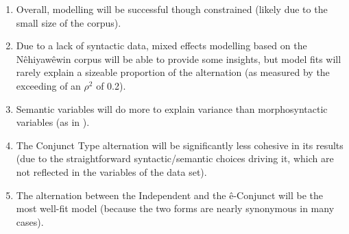 \begin{enumerate}
    \item Overall, modelling will be successful though constrained (likely due to the small size of the corpus).
    \item Due to a lack of syntactic data, mixed effects modelling based on the Nêhiyawêwin corpus will be able to provide some insights, but model fits will rarely explain a sizeable proportion of the alternation (as measured by the exceeding of an $\rho^{2}$ of 0.2).
    \item Semantic variables will do more to explain variance than morphosyntactic variables (as in \citep{arppe2008univariate}).
    \item The Conjunct Type alternation will be significantly less cohesive in its results (due to the straightforward syntactic/semantic choices driving it, which are not reflected in the variables of the data set).
    \item The alternation between the Independent and the ê-Conjunct will be the most well-fit model (because the two forms are nearly synonymous in many cases).
\end{enumerate}